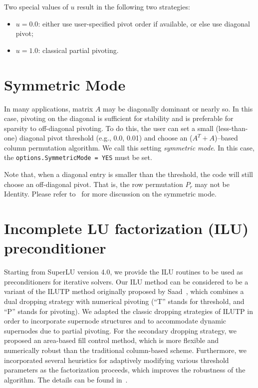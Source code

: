 Two special values of $u$ result in the following two strategies:
\begin{itemize}
\item $u=0.0$: either use user-specified pivot order if available, 
               or else use diagonal pivot;
\item $u=1.0$: classical partial pivoting.
\end{itemize}

\section{Symmetric Mode}
In many applications, matrix $A$ may be diagonally dominant or nearly so.
In this case, pivoting on the diagonal is sufficient for stability and
is preferable for sparsity to off-diagonal pivoting.
To do this, the user can set a small (less-than-one) diagonal pivot threshold
(e.g., 0.0, 0.01) and choose an ($A^T + A$)--based column permutation
algorithm. We call this setting {\em symmetric mode}.
In this case, the {\tt options.SymmetricMode = YES} must be set.

Note that, when a diagonal entry is smaller than the
threshold, the code will still choose an off-diagonal pivot.
That is, the row permutation $P_r$ may not be Identity.
Please refer to~\cite{li05} for more discussion on the symmetric mode.


\section{Incomplete LU factorization (ILU) preconditioner}
Starting from SuperLU version 4.0, we provide the ILU routines to be
used as preconditioners for iterative solvers.  Our ILU method can be
considered to be a variant of the ILUTP method originally proposed by
Saad~\cite{saad94}, which combines a dual dropping strategy with
numerical pivoting (``T'' stands for threshold, and ``P'' stands for
pivoting).  We adapted the classic
dropping strategies of ILUTP in order to incorporate supernode
structures and to accommodate dynamic supernodes due to partial
pivoting. For the secondary dropping strategy, we proposed an
area-based fill control method, which is more flexible and numerically
robust than the traditional column-based scheme.  Furthermore, we
incorporated several heuristics for adaptively modifying various
threshold parameters as the factorization proceeds, which improves
the robustness of the algorithm. The details can be found in~\cite{lishao10}.


